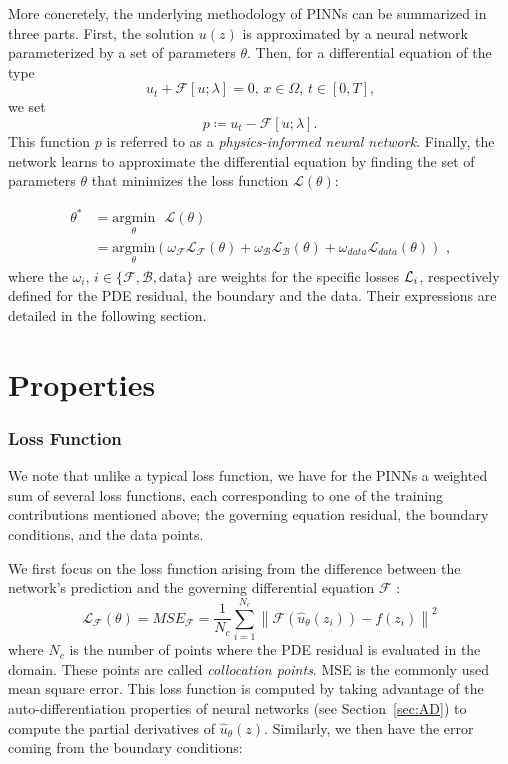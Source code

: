 More concretely, the underlying methodology of PINNs can be summarized in three parts. First, the solution $u(z)$ is approximated by a neural network parameterized by a set of parameters $\theta$. Then, for a differential equation of the type
\begin{equation}
\label{eq:pde-exemple}
u_t + \mathcal{F}[u;\lambda] = 0\text{, } x\in \Omega\text{, } t \in [0, T]\text{,}
\end{equation} we set
\begin{equation}
p \coloneqq u_t - \mathcal{F}[u;\lambda] \text{.}
\end{equation} This function $p$ is referred to as a \emph{physics-informed neural network}. Finally, the network learns to approximate the differential equation by finding the set of parameters $\theta$ that minimizes the loss function $\mathcal{L}(\theta)$:

\begin{align}
    \label{eq:PINN-argmin-loss}
    \theta^* &= \underset{\theta}{\mathrm{argmin }} \text{ }\mathcal{L}(\theta) \nonumber \\
     &= \underset{\theta}{\mathrm{argmin }} \left( \omega_{\mathcal{F}}\mathcal{L}_{\mathcal{F}}(\theta) + \omega_{\mathcal{B}}\mathcal{L}_{\mathcal{B}}(\theta) + \omega_{data}\mathcal{L}_{data}(\theta) \right)\text{ ,}
\end{align}
where the $\omega_i \text{, } i \in \{\mathcal{F}, \mathcal{B}, \mathrm{data}\}$  are weights for the specific losses $\mathcal{L}_i$, respectively defined for the PDE residual, the boundary and the data. Their expressions are detailed in the following section.

\section{Properties}

\subsubsection{Loss Function}
We note that unlike a typical loss function, we have for the PINNs a weighted sum of several loss functions, each corresponding to one of the training contributions mentioned above; the governing equation residual, the boundary conditions, and the data points.

We first focus on the loss function arising from the difference between the network's prediction and the governing differential equation $\mathcal{F}$ :
\begin{equation}
    \label{eq:pde-loss}
    \mathcal{L}_{\mathcal{F}}(\theta) = MSE_{\mathcal{F}} = \dfrac{1}{N_c}\sum^{N_c}_{i=1} \left\|\mathcal{F}(\hat{u}_{\theta}(z_i)) - f(z_i)\right\|^2
\end{equation} where $N_c$ is the number of points where the PDE residual is evaluated in the domain. These points are called \emph{collocation points}. MSE is the commonly used mean square error. This loss function is computed by taking advantage of the auto-differentiation properties of neural networks (see Section~\ref{sec:AD}) to compute the partial derivatives of $\hat{u}_{\theta}(z)$. Similarly, we then have the error coming from the boundary conditions:


